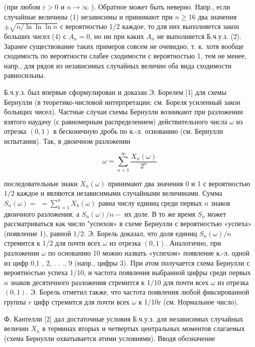\documentclass[10pt]{article}
\begin{document}
(при любом $\varepsilon>0$ и $n \rightarrow \infty$ ). Обратное может быть неверно. Напр., если случайные величины (1) независимы и принимают при $n \geqslant 16$ два значения $\pm \sqrt{n / \ln \ln \ln n}$ с вероятностью 1/2 каждое, то для них выполняется закон больших чисел (4) с $A_{n}=0$, но ни при каких $A_{n}$ не выполняется Б.ч.у.з. (2). Заранее существование таких примеров совсем не очевидно, т. к. хотя вообще сходимость по вероятности слабее сходимости с вероятностью 1, тем не менее, напр., для рядов из независимых случайных величин оба вида сходимости равносильны.



Б.ч.у.з. был впервые сформулирован и доказан Э. Борелем [1] для схемы Бернулли (в теоретико-числовой интерпретации; см. Бореля усиленный закон больицих чисел). Частные случаи схемы Бернулли возникают при разложении взятого наудачу (с равномерным распределением) действительного числа $\omega$ из отрезка $(0,1)$ в бесконечную дробь по к.-л. основанию (см. Бернулли испытания). Так, в двоичном разложении



\[

\omega=\sum_{n=1}^{\infty} \frac{X_{n}(\omega)}{2^{n}}

\]



последовательные знаки $X_{n}(\omega)$ принимают два значения 0 и 1 с вероятностью $1 / 2$ каждое и являются независимыми случайными величинами. Сумма $S_{n}(\omega)=$ $=\sum_{k=1}^{n} X_{k}(\omega)$ равна числу единиц среди первых $n$ знаков двоичного разложения, а $S_{n}(\omega) / n-$ их доле. В то же время $S_{n}$ может рассматриваться как число "успехов» в схеме Бернулли с вероятностью «успеха» (появление 1), равной $1 / 2$. Э. Борель доказал, что доля единиц $S_{n}(\omega) / n$ стремится к 1/2 для почти всех $\omega$ из отрезка $(0,1)$. Аналогично, при разложении $\omega$ по основанию 10 можно назвать «успехом» появление к.-л. одной из цифр 0,1 , 2, . . ., 9 (напр., цифры 3). При әтом получается схема Бернулли с вероятностью успеха 1/10, и частота появления выбранной цифры среди первых $n$ знаков десятичного разложения стремится к 1/10 для почти всех $\omega$ из отрезка $(0,1)$. Э. Борель отметил также, что частота появления любой фиксированной группы $r$ цифр стремится для почти всех $\omega$ к 1/10r (см. Нормальное число).



Ф. Кантелли [2] дал достаточные условия Б.ч.у.з. для независимых случайных величин $X_{n}$ в терминах вторых и четвертых центральных моментов слагаемых (схема Бернулли охватывается әтими условиями). Вводя обозначение
\end{document}
